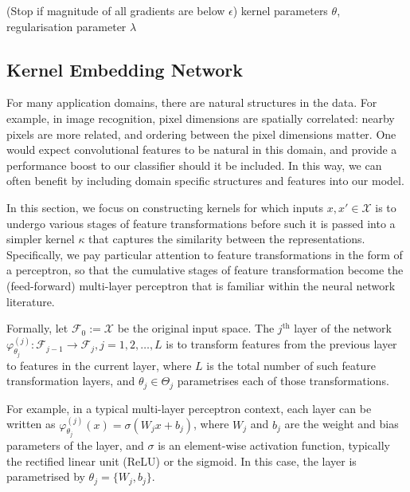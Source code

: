 \documentclass{article}
\begin{document}
\begin{algorithm}[tb]
\begin{algorithmic}[1]
				 \hspace{\fill} (Stop if magnitude of all gradients are below $\epsilon$)
				 kernel parameters $\theta$, regularisation parameter $\lambda$
			\end{algorithmic}
		\end{algorithm}

	\subsection{Kernel Embedding Network}
	\label{app:kernel_embedding_network}
	
		For many application domains, there are natural structures in the data. For example, in image recognition, pixel dimensions are spatially correlated: nearby pixels are more related, and ordering between the pixel dimensions matter. One would expect convolutional features \citep{lecun1998gradient} to be natural in this domain, and provide a performance boost to our classifier should it be included. In this way, we can often benefit by including domain specific structures and features into our model.

		In this section, we focus on constructing kernels for which inputs $x, x' \in \mathcal{X}$ is to undergo various stages of feature transformations before such it is passed into a simpler kernel $\kappa$ that captures the similarity between the representations. Specifically, we pay particular attention to feature transformations in the form of a perceptron, so that the cumulative stages of feature transformation become the (feed-forward) multi-layer perceptron that is familiar within the neural network literature.
	
		Formally, let $\mathcal{F}_{0} := \mathcal{X}$ be the original input space. The $j^{\mathrm{th}}$ layer of the network $\varphi^{(j)}_{\theta_{j}} : \mathcal{F}_{j - 1} \to \mathcal{F}_{j}, j = 1, 2, \dots, L$ is to transform features from the previous layer to features in the current layer, where $L$ is the total number of such feature transformation layers, and $\theta_{j} \in \Theta_{j}$ parametrises each of those transformations.
		
		For example, in a typical multi-layer perceptron context, each layer can be written as $\varphi^{(j)}_{\theta_{j}}(x) = \sigma(W_{j} x + b_{j})$, where $W_{j}$ and $b_{j}$ are the weight and bias parameters of the layer, and $\sigma$ is an element-wise activation function, typically the rectified linear unit (ReLU) or the sigmoid. In this case, the layer is parametrised by $\theta_{j} = \{W_{j}, b_{j}\}$.
		
\end{document}
